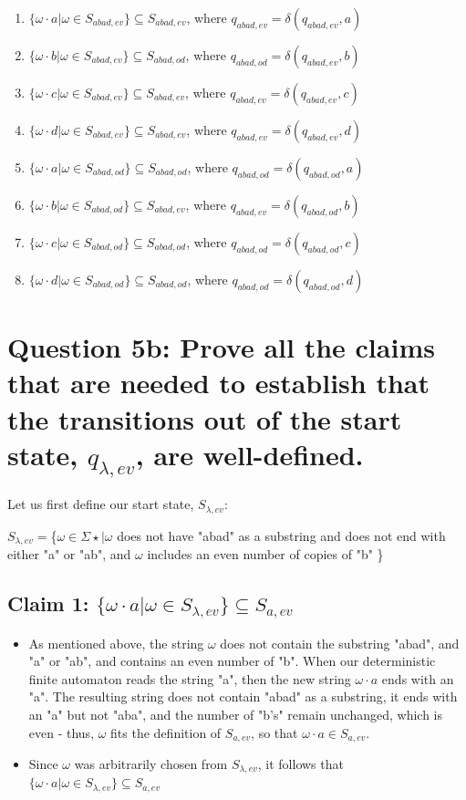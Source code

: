 \documentclass{article}
\begin{document}
\begin{enumerate}
    \item $\{\omega\cdot a|\omega\in S_{abad,ev}\} \subseteq S_{abad,ev}$, where $q_{abad,ev}=\delta(q_{abad,ev},a)$
    \item $\{\omega\cdot b|\omega\in S_{abad,ev}\} \subseteq S_{abad,od}$, where $q_{abad,od}=\delta(q_{abad,ev},b)$
    \item $\{\omega\cdot c|\omega\in S_{abad,ev}\} \subseteq S_{abad,ev}$, where $q_{abad,ev}=\delta(q_{abad,ev},c)$
    \item $\{\omega\cdot d|\omega\in S_{abad,ev}\} \subseteq S_{abad,ev}$, where $q_{abad,ev}=\delta(q_{abad,ev},d)$
    
    \item $\{\omega\cdot a|\omega\in S_{abad,od}\} \subseteq S_{abad,od}$, where $q_{abad,od}=\delta(q_{abad,od},a)$
    \item $\{\omega\cdot b|\omega\in S_{abad,od}\} \subseteq S_{abad,ev}$, where $q_{abad,ev}=\delta(q_{abad,od},b)$
    \item $\{\omega\cdot c|\omega\in S_{abad,od}\} \subseteq S_{abad,od}$, where $q_{abad,od}=\delta(q_{abad,od},c)$
    \item $\{\omega\cdot d|\omega\in S_{abad,od}\} \subseteq S_{abad,od}$, where $q_{abad,od}=\delta(q_{abad,od},d)$
\end{enumerate}

\section*{Question 5b: Prove all the claims that are needed to establish that the transitions out of the start state, $q_{\lambda,ev}$, are well-defined.}
Let us first define our start state, $S_{\lambda,ev}$:
\begin{center}
    $S_{\lambda,ev}=$\{$\omega\in\Sigma\star|\omega$ does not have "abad" as a substring and does not end with either "a" or "ab", and $\omega$ includes an even number of copies of "b" \}
\end{center}

\subsection*{Claim 1: $\{\omega\cdot a|\omega\in S_{\lambda,ev}\} \subseteq S_{a,ev}$}
\begin{itemize}
    \item As mentioned above, the string $\omega$ does not contain the substring "abad", and "a" or "ab", and contains an even number of "b". When our deterministic finite automaton reads the string "a", then 
    the new string $\omega\cdot a$ ends with an "a". The resulting string does not contain "abad" as a substring, it ends with an "a" but not "aba", and the number of "b's" remain unchanged,
    which is even - thus, $\omega$ fits the definition of $S_{a,ev}$, so that $\omega\cdot a\in S_{a,ev}$. 
    \item Since $\omega$ was arbitrarily chosen from $S_{\lambda,ev}$, it follows that $\{\omega\cdot a|\omega\in S_{\lambda,ev}\}\subseteq S_{a,ev}$ 
\end{itemize}
\end{document}
